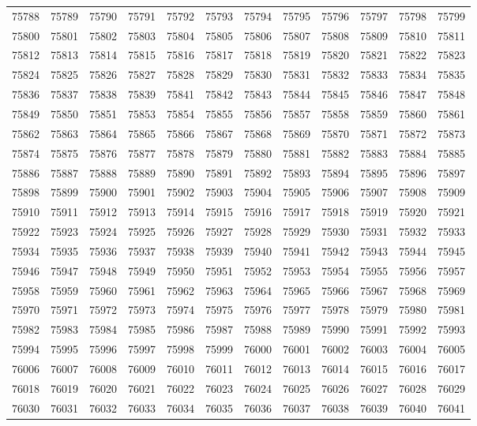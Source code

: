 \begin{center}
\begin{longtable}{llllllllllll}
75788 &75789 &75790 &75791 &75792 &75793 &75794 &75795 &75796 &75797 &75798 &75799 \\
75800 &75801 &75802 &75803 &75804 &75805 &75806 &75807 &75808 &75809 &75810 &75811 \\
75812 &75813 &75814 &75815 &75816 &75817 &75818 &75819 &75820 &75821 &75822 &75823 \\
75824 &75825 &75826 &75827 &75828 &75829 &75830 &75831 &75832 &75833 &75834 &75835 \\
75836 &75837 &75838 &75839 &75841 &75842 &75843 &75844 &75845 &75846 &75847 &75848 \\
75849 &75850 &75851 &75853 &75854 &75855 &75856 &75857 &75858 &75859 &75860 &75861 \\
75862 &75863 &75864 &75865 &75866 &75867 &75868 &75869 &75870 &75871 &75872 &75873 \\
75874 &75875 &75876 &75877 &75878 &75879 &75880 &75881 &75882 &75883 &75884 &75885 \\
75886 &75887 &75888 &75889 &75890 &75891 &75892 &75893 &75894 &75895 &75896 &75897 \\
75898 &75899 &75900 &75901 &75902 &75903 &75904 &75905 &75906 &75907 &75908 &75909 \\
75910 &75911 &75912 &75913 &75914 &75915 &75916 &75917 &75918 &75919 &75920 &75921 \\
75922 &75923 &75924 &75925 &75926 &75927 &75928 &75929 &75930 &75931 &75932 &75933 \\
75934 &75935 &75936 &75937 &75938 &75939 &75940 &75941 &75942 &75943 &75944 &75945 \\
75946 &75947 &75948 &75949 &75950 &75951 &75952 &75953 &75954 &75955 &75956 &75957 \\
75958 &75959 &75960 &75961 &75962 &75963 &75964 &75965 &75966 &75967 &75968 &75969 \\
75970 &75971 &75972 &75973 &75974 &75975 &75976 &75977 &75978 &75979 &75980 &75981 \\
75982 &75983 &75984 &75985 &75986 &75987 &75988 &75989 &75990 &75991 &75992 &75993 \\
75994 &75995 &75996 &75997 &75998 &75999 &76000 &76001 &76002 &76003 &76004 &76005 \\
76006 &76007 &76008 &76009 &76010 &76011 &76012 &76013 &76014 &76015 &76016 &76017 \\
76018 &76019 &76020 &76021 &76022 &76023 &76024 &76025 &76026 &76027 &76028 &76029 \\
76030 &76031 &76032 &76033 &76034 &76035 &76036 &76037 &76038 &76039 &76040 &76041 \\

\end{longtable}
\end{center}

